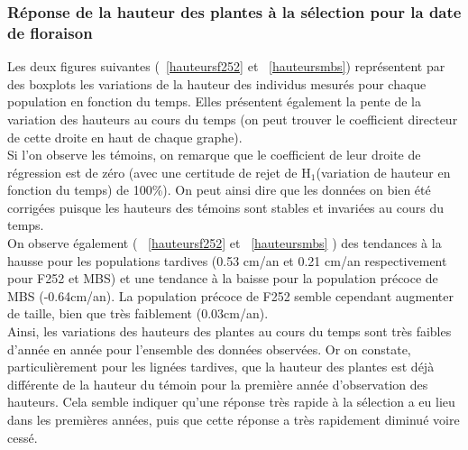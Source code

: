 \documentclass[12pt,a4paper]{article}
\begin{document}
			 			\subsubsection{Réponse de la hauteur des plantes à la sélection pour la date de floraison}
			 				
			 				Les deux figures suivantes (~\ref{hauteursf252} et ~\ref{hauteursmbs}) représentent par des boxplots les variations de la hauteur des individus mesurés pour chaque population en fonction du temps. Elles présentent également la pente de la variation des hauteurs au cours du temps (on peut trouver le coefficient directeur de cette droite en haut de chaque graphe).\\
			 				Si l'on observe les témoins, on remarque que le coefficient de leur droite de régression est de zéro (avec une certitude de rejet de H$_{1}$(variation de hauteur en fonction du temps) de 100\%). On peut ainsi dire que les données on bien été corrigées puisque les hauteurs des témoins sont stables et invariées au cours du temps.\\
			 				
			 				On observe également ( \bsc{Figure}~\ref{hauteursf252} et ~\ref{hauteursmbs} ) des tendances à la hausse pour les populations tardives (0.53 cm/an et 0.21 cm/an respectivement pour F252 et MBS)  et une tendance à la baisse pour la population précoce de MBS (-0.64cm/an). La population précoce de F252 semble cependant augmenter de taille, bien que très faiblement (0.03cm/an).\\		 				
			 				Ainsi, les variations des hauteurs des plantes au cours du temps sont très faibles d'année en année pour l'ensemble des données observées. Or on constate, particulièrement pour les lignées tardives, que la hauteur des plantes est déjà différente de la hauteur du témoin pour la première année d'observation des hauteurs. Cela semble indiquer qu'une réponse très rapide à la sélection a eu lieu dans les premières années, puis que cette réponse a très rapidement diminué voire cessé.
			 				
\end{document}
